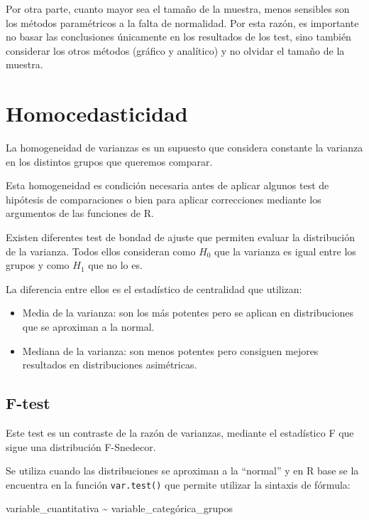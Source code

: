 \documentclass[
  spanish,
  a4paper,
]{scrbook}
\newenvironment{Shaded}{\begin{snugshade}}{\end{snugshade}}
\newcommand{\NormalTok}[1]{\textcolor[rgb]{0.00,0.23,0.31}{#1}}
\newcommand{\SpecialCharTok}[1]{\textcolor[rgb]{0.37,0.37,0.37}{#1}}
\begin{document}
Por otra parte, cuanto mayor sea el tamaño de la muestra, menos
sensibles son los métodos paramétricos a la falta de normalidad. Por
esta razón, es importante no basar las conclusiones únicamente en los
resultados de los test, sino también considerar los otros métodos
(gráfico y analítico) y no olvidar el tamaño de la muestra.

\section{Homocedasticidad}\label{homocedasticidad}

La homogeneidad de varianzas es un supuesto que considera constante la
varianza en los distintos grupos que queremos comparar.

Esta homogeneidad es condición necesaria antes de aplicar algunos test
de hipótesis de comparaciones o bien para aplicar correcciones mediante
los argumentos de las funciones de R.

Existen diferentes test de bondad de ajuste que permiten evaluar la
distribución de la varianza. Todos ellos consideran como \(H_0\) que la
varianza es igual entre los grupos y como \(H_1\) que no lo es.

La diferencia entre ellos es el estadístico de centralidad que utilizan:

\begin{itemize}
\item
  Media de la varianza: son los más potentes pero se aplican en
  distribuciones que se aproximan a la normal.
\item
  Mediana de la varianza: son menos potentes pero consiguen mejores
  resultados en distribuciones asimétricas.
\end{itemize}

\subsection{F-test}\label{f-test}

Este test es un contraste de la razón de varianzas, mediante el
estadístico F que sigue una distribución F-Snedecor.

Se utiliza cuando las distribuciones se aproximan a la ``normal'' y en R
base se la encuentra en la función \texttt{var.test()} que permite
utilizar la sintaxis de fórmula:

\begin{Shaded}
\begin{Highlighting}[]
\NormalTok{variable\_cuantitativa }\SpecialCharTok{\textasciitilde{}}\NormalTok{ variable\_categórica\_grupos}
\end{Highlighting}
\end{Shaded}
\end{document}
